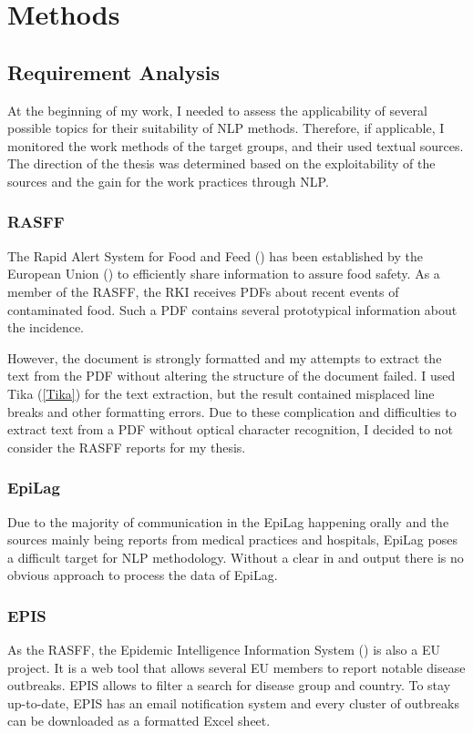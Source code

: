 \chapter{Methods}

\section{Requirement Analysis}
At the beginning of my work, I needed to assess the applicability of several possible topics for their suitability of NLP methods.
Therefore, if applicable, I monitored the work methods of the target groups, and their used textual sources.
The direction of the thesis was determined based on the exploitability of the sources and the gain for the work practices through NLP.

\subsection{RASFF}
The Rapid Alert System for Food and Feed () has been established by the European Union () to efficiently share information to assure food safety. As a member of the RASFF, the RKI receives PDFs about recent events of contaminated food. Such a PDF contains several prototypical information about the incidence.

However, the document is strongly formatted and my attempts to extract the text from the PDF without altering the structure of the document failed. I used Tika (\ref{Tika}) for the text extraction, but the result contained misplaced line breaks and other formatting errors. Due to these complication and difficulties to extract text from a PDF without optical character recognition, I decided to not consider the RASFF reports for my thesis.

\subsection{EpiLag}
Due to the majority of communication in the EpiLag happening orally and the sources mainly being reports from medical practices and hospitals, EpiLag poses a difficult target for NLP methodology.
Without a clear in and output there is no obvious approach to process the data of EpiLag.

\subsection{EPIS}
As the RASFF, the Epidemic Intelligence Information System () is also a EU project. It is a web tool that allows several EU members to report notable disease outbreaks. EPIS allows to filter a search for disease group and country. To stay up-to-date, EPIS has an email notification system and every cluster of outbreaks can be downloaded as a formatted Excel sheet.

